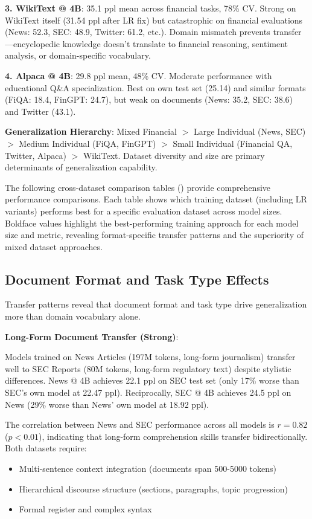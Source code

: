 \textbf{3. WikiText @ 4B}: 35.1 ppl mean across financial tasks, 78\% CV. Strong on WikiText itself (31.54 ppl after LR fix) but catastrophic on financial evaluations (News: 52.3, SEC: 48.9, Twitter: 61.2, etc.). Domain mismatch prevents transfer—encyclopedic knowledge doesn't translate to financial reasoning, sentiment analysis, or domain-specific vocabulary.

\textbf{4. Alpaca @ 4B}: 29.8 ppl mean, 48\% CV. Moderate performance with educational Q\&A specialization. Best on own test set (25.14) and similar formats (FiQA: 18.4, FinGPT: 24.7), but weak on documents (News: 35.2, SEC: 38.6) and Twitter (43.1).

\textbf{Generalization Hierarchy}: Mixed Financial $>$ Large Individual (News, SEC) $>$ Medium Individual (FiQA, FinGPT) $>$ Small Individual (Financial QA, Twitter, Alpaca) $>$ WikiText. Dataset diversity and size are primary determinants of generalization capability.

The following cross-dataset comparison tables () provide comprehensive performance comparisons. Each table shows which training dataset (including LR variants) performs best for a specific evaluation dataset across model sizes. Boldface values highlight the best-performing training approach for each model size and metric, revealing format-specific transfer patterns and the superiority of mixed dataset approaches.

\subsection{Document Format and Task Type Effects}

Transfer patterns reveal that document format and task type drive generalization more than domain vocabulary alone.

\textbf{Long-Form Document Transfer (Strong)}:

Models trained on News Articles (197M tokens, long-form journalism) transfer well to SEC Reports (80M tokens, long-form regulatory text) despite stylistic differences. News @ 4B achieves 22.1 ppl on SEC test set (only 17\% worse than SEC's own model at 22.47 ppl). Reciprocally, SEC @ 4B achieves 24.5 ppl on News (29\% worse than News' own model at 18.92 ppl).

The correlation between News and SEC performance across all models is $r = 0.82$ ($p < 0.01$), indicating that long-form comprehension skills transfer bidirectionally. Both datasets require:
\begin{itemize}
\item Multi-sentence context integration (documents span 500-5000 tokens)
\item Hierarchical discourse structure (sections, paragraphs, topic progression)
\item Formal register and complex syntax
\end{itemize}


